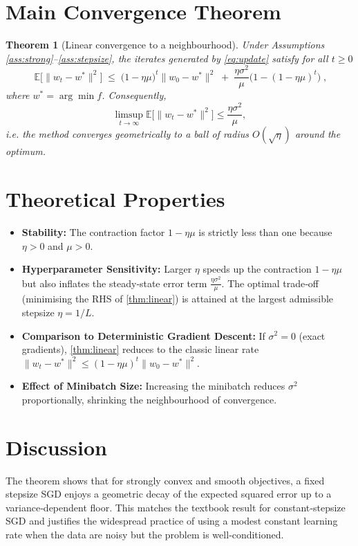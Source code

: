 \documentclass[11pt]{article}
\newtheorem{theorem}{Theorem}
\newcommand{\E}{\mathbb{E}}
\begin{document}
\section*{Main Convergence Theorem}
\begin{theorem}[Linear convergence to a neighbourhood]\label{thm:linear}
Under Assumptions \ref{ass:strong}–\ref{ass:stepsize}, the iterates generated by \eqref{eq:update} satisfy for all $t\ge0$
\[
\boxed{\;
\E\!\big[\|w_{t}-w^{*}\|^{2}\big]\;\le\;\big(1-\eta\mu\big)^{t}\|w_{0}-w^{*}\|^{2}
\;+\;\frac{\eta\sigma^{2}}{\mu}\big(1-(1-\eta\mu)^{t}\big)\;},
\tag{1}
\]
where $w^{*}=\arg\min f$.
Consequently,
\[
\limsup_{t\to\infty}\E\!\big[\|w_{t}-w^{*}\|^{2}\big]\le\frac{\eta\sigma^{2}}{\mu},
\]
i.e. the method converges geometrically to a ball of radius $O(\sqrt{\eta})$ around the optimum.
\end{theorem}

\section*{Theoretical Properties}
\begin{itemize}
\item \textbf{Stability:} The contraction factor $1-\eta\mu$ is strictly less than one because $\eta>0$ and $\mu>0$.
\item \textbf{Hyperparameter Sensitivity:} Larger $\eta$ speeds up the contraction $1-\eta\mu$ but also inflates the steady‑state error term $\frac{\eta\sigma^{2}}{\mu}$. The optimal trade‑off (minimising the RHS of \eqref{thm:linear}) is attained at the largest admissible stepsize $\eta=1/L$.
\item \textbf{Comparison to Deterministic Gradient Descent:} If $\sigma^{2}=0$ (exact gradients), \eqref{thm:linear} reduces to the classic linear rate $\|w_{t}-w^{*}\|^{2}\le(1-\eta\mu)^{t}\|w_{0}-w^{*}\|^{2}$.
\item \textbf{Effect of Minibatch Size:} Increasing the minibatch reduces $\sigma^{2}$ proportionally, shrinking the neighbourhood of convergence.
\end{itemize}

\section*{Discussion}
The theorem shows that for strongly convex and smooth objectives, a fixed stepsize SGD enjoys a geometric decay of the expected squared error up to a variance‑dependent floor. This matches the textbook result for constant‑stepsize SGD and justifies the widespread practice of using a modest constant learning rate when the data are noisy but the problem is well‑conditioned.
\end{document}
